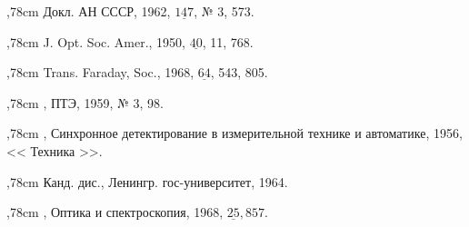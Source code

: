 \noindent{},78cm
 Докл. АН СССР,
1962, $\underline{147}$, № 3, 573.
\vskip 2mm

\noindent{},78cm
 J. Opt. Soc. Amer., 1950,
$\underline{40}$, 11, 768.
\vskip 2mm

\noindent{},78cm
 Trans. Faraday, Soc., 1968,
$\underline{64}$, 543, 805.
\vskip 2mm

\noindent{},78cm
, ПТЭ, 1959, № 3, 98.
\vskip 2mm

\noindent{},78cm
, Синхронное детектирование в
измерительной технике и автоматике, 1956, << Техника >>.
\vskip 2mm

\noindent{},78cm
 Канд. дис., Ленингр.
гос-университет, 1964.
\vskip 2mm

\noindent{},78cm
, Оптика и спектроскопия, 1968,
$\underline{25}, 857.$
\vskip 2mm
